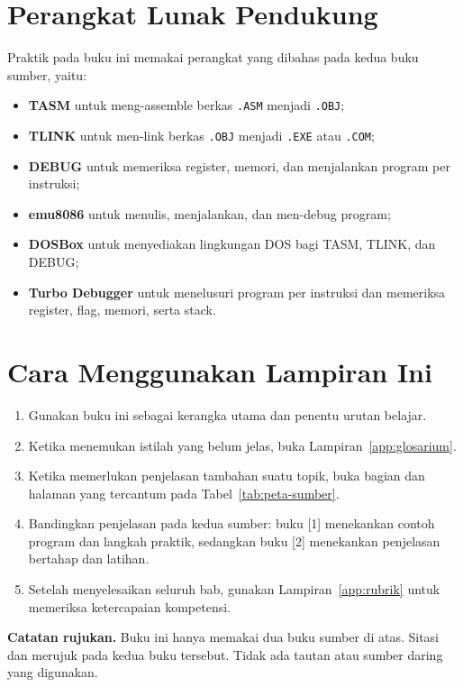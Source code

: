 \section{Perangkat Lunak Pendukung}

Praktik pada buku ini memakai perangkat yang dibahas pada kedua buku
sumber, yaitu:

\begin{itemize}
    \item \textbf{TASM} untuk meng-assemble berkas \texttt{.ASM} menjadi
          \texttt{.OBJ};
    \item \textbf{TLINK} untuk men-link berkas \texttt{.OBJ} menjadi
          \texttt{.EXE} atau \texttt{.COM};
    \item \textbf{DEBUG} untuk memeriksa register, memori, dan
          menjalankan program per instruksi;
    \item \textbf{emu8086} untuk menulis, menjalankan, dan men-debug
          program;
    \item \textbf{DOSBox} untuk menyediakan lingkungan DOS bagi TASM,
          TLINK, dan DEBUG;
    \item \textbf{Turbo Debugger} untuk menelusuri program per instruksi
          dan memeriksa register, flag, memori, serta stack.
\end{itemize}

\section{Cara Menggunakan Lampiran Ini}

\begin{enumerate}
    \item Gunakan buku ini sebagai kerangka utama dan penentu urutan
          belajar.
    \item Ketika menemukan istilah yang belum jelas, buka
          Lampiran~\ref{app:glosarium}.
    \item Ketika memerlukan penjelasan tambahan suatu topik, buka bagian
          dan halaman yang tercantum pada Tabel~\ref{tab:peta-sumber}.
    \item Bandingkan penjelasan pada kedua sumber: buku [1] menekankan
          contoh program dan langkah praktik, sedangkan buku [2]
          menekankan penjelasan bertahap dan latihan.
    \item Setelah menyelesaikan seluruh bab, gunakan
          Lampiran~\ref{app:rubrik} untuk memeriksa ketercapaian
          kompetensi.
\end{enumerate}

\begin{infobox}
\textbf{Catatan rujukan.} Buku ini hanya memakai dua buku sumber di
atas. Sitasi \cite{gunawan2019} dan \cite{sto2001} merujuk pada kedua
buku tersebut. Tidak ada tautan atau sumber daring yang digunakan.
\end{infobox}
